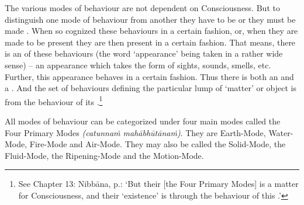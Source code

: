 The various modes of behaviour are not dependent on Consciousness. But to distinguish one mode of behaviour from another they have to be  or they must be made . When so cognized these behaviours  in a certain fashion, or, when they are made to be present they are then present in a certain fashion. That means, there is an  of these behaviours (the word `appearance' being taken in a rather wide sense) -- an appearance which takes the form of sights, sounds, smells, etc. Further, this appearance behaves in a certain fashion. Thus there is both an  and a . And the set of behaviours defining the particular lump of `matter' or object is  from the behaviour of its .\footnote{See Chapter 13: Nibbāna, p.\pageref{ch-13-the-four-primary}: `But their [the Four Primary Modes]  is a matter for Consciousness, and their `existence' is  through the behaviour of this .'}

All modes of behaviour can be categorized under four main modes called the Four Primary Modes \emph{(catunnaṁ mahābhūtānaṁ)}. They are Earth-Mode, Water-Mode, Fire-Mode and Air-Mode. They may also be called the Solid-Mode, the Fluid-Mode, the Ripening-Mode and the Motion-Mode.

